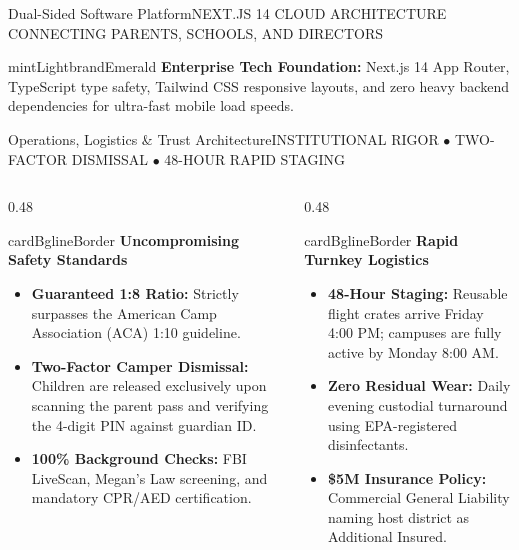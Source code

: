 \documentclass[aspectratio=169,9pt]{beamer}
\begin{document}
\begin{frame}{Dual-Sided Software Platform}{NEXT.JS 14 CLOUD ARCHITECTURE CONNECTING PARENTS, SCHOOLS, AND DIRECTORS}
\vskip4pt
\begin{execbox}{mintLight}{brandEmerald}
  \scriptsize
  \textbf{Enterprise Tech Foundation:} Next.js 14 App Router, TypeScript type safety, Tailwind CSS responsive layouts, and zero heavy backend dependencies for ultra-fast mobile load speeds.
\end{execbox}

\end{frame}

\begin{frame}{Operations, Logistics \& Trust Architecture}{INSTITUTIONAL RIGOR $\bullet$ TWO-FACTOR DISMISSAL $\bullet$ 48-HOUR RAPID STAGING}

\begin{columns}[T]
  \begin{column}{0.48\textwidth}
    \begin{execbox}{cardBg}{lineBorder}
      \textcolor{brandEmerald}{\textbf{\scriptsize Uncompromising Safety Standards}} \\[2pt]
      \tiny
      \begin{itemize}
        \item \textbf{Guaranteed 1:8 Ratio:} Strictly surpasses the American Camp Association (ACA) 1:10 guideline.
        \item \textbf{Two-Factor Camper Dismissal:} Children are released exclusively upon scanning the parent pass and verifying the 4-digit PIN against guardian ID.
        \item \textbf{100\% Background Checks:} FBI LiveScan, Megan's Law screening, and mandatory CPR/AED certification.
      \end{itemize}
    \end{execbox}
  \end{column}

  \begin{column}{0.48\textwidth}
    \begin{execbox}{cardBg}{lineBorder}
      \textcolor{brandNavy}{\textbf{\scriptsize Rapid Turnkey Logistics}} \\[2pt]
      \tiny
      \begin{itemize}
        \item \textbf{48-Hour Staging:} Reusable flight crates arrive Friday 4:00 PM; campuses are fully active by Monday 8:00 AM.
        \item \textbf{Zero Residual Wear:} Daily evening custodial turnaround using EPA-registered disinfectants.
        \item \textbf{\$5M Insurance Policy:} Commercial General Liability naming host district as Additional Insured.
      \end{itemize}
    \end{execbox}
  \end{column}
\end{columns}


\end{frame}
\end{document}
